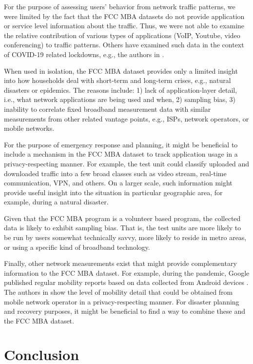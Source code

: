 \documentclass[conference,10pt]{IEEEtran}
\begin{document}
For the purpose of assessing users' behavior from network traffic patterns, we were limited by the fact that the FCC MBA datasets do not provide application or service level information about the traffic. Thus, we were not able to examine the relative contribution of various types of applications (VoIP, Youtube, video conferencing) to traffic patterns. Others have examined such data in the context of COVID-19 related lockdowns, e.g., the authors in \cite{bottger2020internet}.

When used in isolation, the FCC MBA dataset provides only a limited insight into how households deal with short-term and long-term crises, e.g., natural disasters or epidemics. The reasons include: 1) lack of application-layer detail, i.e., what network applications are being used and when, 2) sampling bias, 3) inability to correlate fixed broadband measurement data with similar measurements from other related vantage points, e.g., ISPs, network operators, or mobile networks.

For the purpose of emergency response and planning, it might be beneficial to include a mechanism in the FCC MBA dataset to track application usage in a privacy-respecting manner. For example, the test unit could classify uploaded and downloaded traffic into a few broad classes such as video stream, real-time communication, VPN, and others. On a larger scale, such information might provide useful insight into the situation in particular geographic area, for example, during a natural disaster. 

Given that the FCC MBA program is a volunteer based program, the collected data is likely to exhibit sampling bias. That is, the test units are more likely to be run by users somewhat technically savvy, more likely to reside in metro areas, or using a specific kind of broadband technology.

Finally, other network measurements exist that might provide complementary information to the FCC MBA dataset. For example, during the pandemic, Google published regular mobility reports based on data collected from Android devices \cite{google-mobility-report}. The authors in \cite{lutu2020mobile} show the level of mobility detail that could be obtained from mobile network operator in a privacy-respecting manner. For disaster planning and recovery purposes, it might be beneficial to find a way to combine these and the FCC MBA dataset.

\section{Conclusion}
\label{sec:conclusion}
\end{document}
